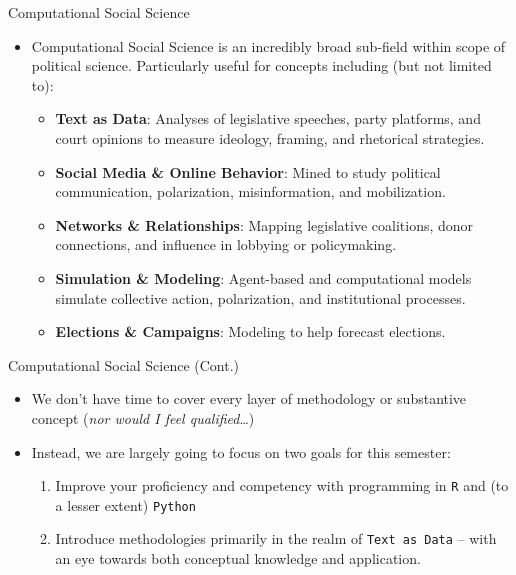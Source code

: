 \documentclass[
  ignorenonframetext,
]{beamer}
\providecommand{\tightlist}{%
  \setlength{\itemsep}{0pt}\setlength{\parskip}{0pt}}
\begin{document}
\begin{frame}{Computational Social Science}
\label{computational-social-science}
\begin{itemize}
\tightlist
\item
  Computational Social Science is an incredibly broad sub-field within
  scope of political science. Particularly useful for concepts including
  (but not limited to):

  \par \vspace{2.5mm}

  \begin{itemize}
  \tightlist
  \item
    \footnotesize \textbf{Text as Data}: Analyses of legislative
    speeches, party platforms, and court opinions to measure ideology,
    framing, and rhetorical strategies.
  \item
    \footnotesize \textbf{Social Media \& Online Behavior}: Mined to
    study political communication, polarization, misinformation, and
    mobilization.
  \item
    \footnotesize \textbf{Networks \& Relationships}: Mapping
    legislative coalitions, donor connections, and influence in lobbying
    or policymaking.
  \item
    \footnotesize \textbf{Simulation \& Modeling}: Agent-based and
    computational models simulate collective action, polarization, and
    institutional processes.
  \item
    \footnotesize \textbf{Elections \& Campaigns}: Modeling to help
    forecast elections.
  \end{itemize}
\end{itemize}
\end{frame}

\begin{frame}{Computational Social Science (Cont.)}
\label{computational-social-science-cont.}
\begin{itemize}
\tightlist
\item
  We don't have time to cover every layer of methodology or substantive
  concept (\emph{nor would I feel qualified}\ldots)
\item
  Instead, we are largely going to focus on two goals for this semester:

  \par \vspace{2.5mm}
  \begin{enumerate}
  \item Improve your proficiency and competency with programming in \texttt{R} and (to a lesser extent) \texttt{Python} \par \vspace{2.5mm}
  \item Introduce methodologies primarily in the realm of \texttt{Text as Data} – with an eye towards both conceptual knowledge and application.
  \end{enumerate}
\end{itemize}
\end{frame}
\end{document}
